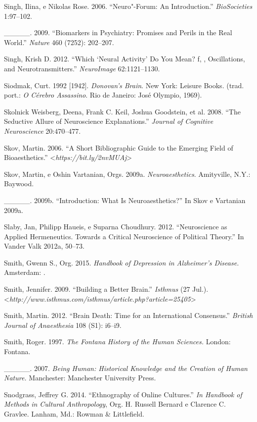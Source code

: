 {\begin{Parskip}
Singh, Ilina, e Nikolas Rose. 2006. ``Neuro"-Forum: An Introduction.''
\emph{BioSocieties} 1:97--102.

\_\_\_\_\_. 2009. ``Biomarkers in Psychiatry: Promises and Perils in the
Real World.'' \emph{Nature} 460 (7252): 202--207.

Singh, Krish D. 2012. ``Which `Neural Activity' Do You Mean? f, ,
Oscillations, and Neurotransmitters.'' \emph{NeuroImage} 62:1121--1130.

Siodmak, Curt. 1992 {[}1942{]}. \emph{Donovan's Brain}. New York:
Leisure Books. (trad. port.: \emph{O Cérebro Assassino}. Rio de Janeiro:
José Olympio, 1969).

Skolnick Weisberg, Deena, Frank C. Keil, Joshua Goodstein, et al. 2008.
``The Seductive Allure of Neuroscience Explanations.'' \emph{Journal of
Cognitive Neuroscience} 20:470--477.

Skov, Martin. 2006. ``A Short Bibliographic Guide to the Emerging Field
of Bioaesthetics.''
\textless{}\emph{https://bit.ly/2nvMUAj}\textgreater{}

Skov, Martin, e Oshin Vartanian, Orgs. 2009a. \emph{Neuroaesthetics}.
Amityville, N.Y.: Baywood.

\_\_\_\_\_. 2009b. ``Introduction: What Is Neuroaesthetics?'' In Skov e
Vartanian 2009a.

Slaby, Jan, Philipp Haueis, e Suparna Choudhury. 2012. ``Neuroscience as
Applied Hermeneutics. Towards a Critical Neuroscience of Political
Theory.'' In Vander Valk 2012a, 50--73.

Smith, Gwenn S., Org. 2015. \emph{Handbook of Depression in Alzheimer's
Disease.} Amsterdam: .

Smith, Jennifer. 2009. ``Building a Better Brain.'' \emph{Isthmus} (27
Jul.). \textless{}\emph{http://www.isthmus.com/isthmus/article.php?article​=25405}\textgreater{}

Smith, Martin. 2012. ``Brain Death: Time for an International
Consensus.'' \emph{British Journal of Anaesthesia} 108 (S1): i6--i9.

Smith, Roger. 1997. \emph{The Fontana History of the Human Sciences.}
London: Fontana.

\_\_\_\_\_. 2007. \emph{Being Human: Historical Knowledge and the
Creation of Human Nature.} Manchester: Manchester University Press.

Snodgrass, Jeffrey G. 2014. ``Ethnography of Online Cultures.'' \emph{In
Handbook of Methods in Cultural Anthropology}, Org. H. Russell Bernard e
Clarence C. Gravlee. Lanham, Md.: Rowman \& Littlefield.


\end{Parskip}}
